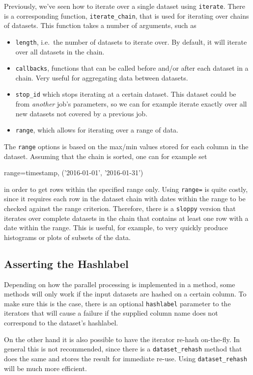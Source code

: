 Previously, we've seen how to iterate over a single dataset using
\texttt{iterate}.  There is a corresponding function,
\texttt{iterate\_chain}, that is used for iterating over chains of
datasets.  This function takes a number of arguments, such as
\begin{itemize}
\item[] \texttt{length}, i.e.\ the number of datasets to iterate over.
  By default, it will iterate over all datasets in the chain.
\item[] \texttt{callbacks}, functions that can be called before and/or
  after each dataset in a chain.  Very useful for aggregating data
  between datasets.
\item[] \texttt{stop\_id} which stops iterating at a certain dataset.
  This dataset could be from \textsl{another} job's parameters, so we
  can for example iterate exactly over all new datasets not covered by
  a previous job.

\item[] \texttt{range}, which allows for iterating over a range of
  data.
\end{itemize}
The \texttt{range} options is based on the max/min values stored for
each column in the dataset.  Assuming that the chain is sorted, one
can for example set
\begin{python}
  range={timestamp, ('2016-01-01', '2016-01-31')}
\end{python}
in order to get rows within the specified range only.  Using
\texttt{range=} is quite costly, since it requires each row in the
dataset chain with dates within the range to be checked against the
range criterion.  Therefore, there is a \texttt{sloppy} version that
iterates over complete datasets in the chain that contains at least
one row with a date within the range.  This is useful, for example, to
very quickly produce histograms or plots of subsets of the data.


\subsection{Asserting the Hashlabel}
Depending on how the parallel processing is implemented in a method,
some methods will only work if the input datasets are hashed on a
certain column.  To make sure this is the case, there is an optional
\texttt{hashlabel} parameter to the iterators that will cause a
failure if the supplied column name does not correspond to the
dataset's hashlabel.

On the other hand it is also possible to have the iterator re-hash
on-the-fly.  In general this is not recommended, since there is a
\texttt{dataset\_rehash} method that does the same and stores the
result for immediate re-use.  Using \texttt{dataset\_rehash} will be
much more efficient.

